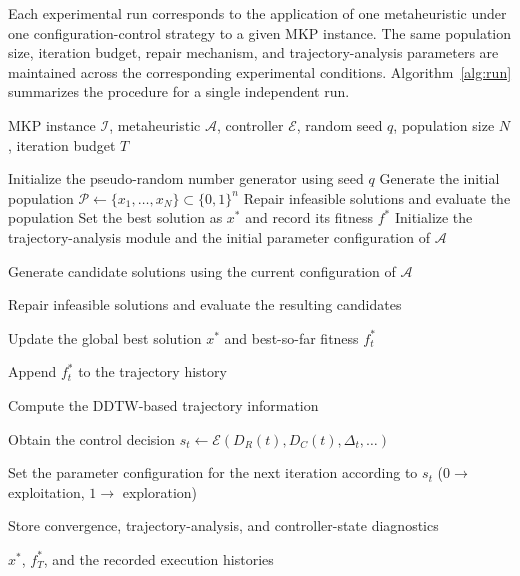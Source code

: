 \documentclass[journal,article,submit,moreauthors]{Definitions/mdpi}
\begin{document}
Each experimental run corresponds to the application of one metaheuristic under one configuration-control strategy to a given MKP instance. The same
population size, iteration budget, repair mechanism, and trajectory-analysis
parameters are maintained across the corresponding experimental conditions.
Algorithm~\ref{alg:run} summarizes the procedure for a single independent
run.

\begin{algorithm}[hbtp]
\caption{Procedure for a single independent experimental run.}
\label{alg:run}
\begin{algorithmic}[1]

\Require MKP instance $\mathcal{I}$, metaheuristic $\mathcal{A}$,
controller $\mathcal{E}$, random seed $q$, population size $N$,
iteration budget $T$

\State Initialize the pseudo-random number generator using seed $q$
\State Generate the initial population
$\mathcal{P}\leftarrow\{x_1,\ldots,x_N\}\subset\{0,1\}^{n}$
\State Repair infeasible solutions and evaluate the population
\State Set the best solution as $x^*$ and record its fitness $f^*$
\State Initialize the trajectory-analysis module and the initial parameter
configuration of $\mathcal{A}$


    \State Generate candidate solutions using the current configuration of
    $\mathcal{A}$

    \State Repair infeasible solutions and evaluate the resulting candidates

    \State Update the global best solution $x^*$ and best-so-far fitness $f_t^*$

    \State Append $f_t^*$ to the trajectory history


        \State Compute the DDTW-based trajectory information

        \State Obtain the control decision
        $s_t \leftarrow \mathcal{E}(D_R(t),D_C(t),\Delta_t,\ldots)$

        \State Set the parameter configuration for the next iteration
        according to $s_t$
        ($0\rightarrow$ exploitation, $1\rightarrow$ exploration)

    \EndIf

    \State Store convergence, trajectory-analysis, and controller-state
diagnostics

\EndFor

\State \Return $x^*$, $f_T^*$, and the recorded execution histories

\end{algorithmic}
\end{algorithm}
\end{document}
